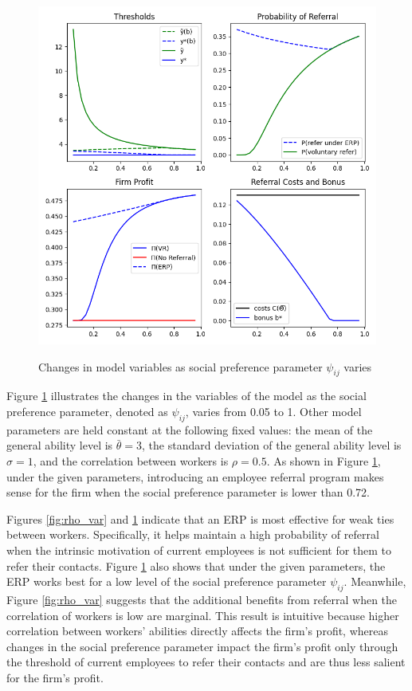 \documentclass[12pt]{article}
\begin{document}
\begin{figure}[ht]
    \caption{Changes in model variables as social preference parameter $\psi_{ij}$ varies}
    \includegraphics[width=12cm]{images/imperf_psi_var.png}
    \centering
    \label{fig:psi_var}
\end{figure}

Figure \ref{fig:psi_var} illustrates the changes in the  variables of the model as the social preference parameter, denoted as $\psi_{ij}$, varies from 0.05 to 1. Other model parameters are held constant at the following fixed values: the mean of the general ability level is $\bar{\theta} = 3$, the standard deviation of the general ability level is $\sigma = 1$, and the correlation between workers is $\rho = 0.5$. As shown in Figure \ref{fig:psi_var}, under the given parameters, introducing an employee referral program makes sense for the firm when the social preference parameter is lower than 0.72.

Figures \ref{fig:rho_var} and \ref{fig:psi_var} indicate that an ERP is most effective for weak ties between workers. Specifically, it helps maintain a high probability of referral when the intrinsic motivation of current employees is not sufficient for them to refer their contacts. Figure \ref{fig:psi_var} also shows that under the given parameters, the ERP works best for a low level of the social preference parameter $\psi_{ij}$. Meanwhile, Figure \ref{fig:rho_var} suggests that the additional benefits from referral when the correlation of workers is low are marginal. This result is intuitive because higher correlation between workers' abilities directly affects the firm's profit, whereas changes in the social preference parameter impact the firm's profit only through the threshold of current employees to refer their contacts and are thus less salient for the firm's profit.
\pagebreak
\end{document}
